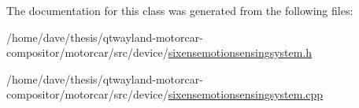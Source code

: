 The documentation for this class was generated from the following files\-:\begin{DoxyCompactItemize}
\item 
/home/dave/thesis/qtwayland-\/motorcar-\/compositor/motorcar/src/device/\hyperlink{sixensemotionsensingsystem_8h}{sixensemotionsensingsystem.\-h}\item 
/home/dave/thesis/qtwayland-\/motorcar-\/compositor/motorcar/src/device/\hyperlink{sixensemotionsensingsystem_8cpp}{sixensemotionsensingsystem.\-cpp}\end{DoxyCompactItemize}
